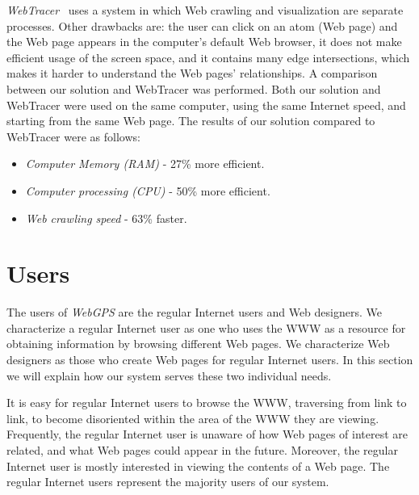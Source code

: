 \documentclass[10pt,psfig]{article}
\begin{document}
{%
{\em WebTracer}~\cite{webtracer} uses a system in which Web crawling and visualization are separate processes.
Other drawbacks are: the user can click on an atom (Web page) and the Web page appears in the computer's default Web browser, it does not make efficient usage of the screen space, and it contains many edge intersections, which makes it harder to understand the Web pages' relationships.
A comparison between our solution and WebTracer was performed.
Both our solution and WebTracer were used on the same computer, using the same Internet speed, and starting from the same Web page.
The results of our solution compared to WebTracer were as follows:

\begin{itemize}

\item {{\em Computer Memory (RAM)} - 27\% more efficient.}

\item {{\em Computer processing (CPU)} - 50\% more efficient.}

\item {{\em Web crawling speed} - 63\% faster.}

\end{itemize}

\section{Users}
\label{se:users}

The users of {\em WebGPS} are the regular Internet users and Web designers.  We characterize a regular Internet user as one who uses the WWW as a resource for 
obtaining information by browsing different Web pages.  
We characterize Web designers as those who create Web pages for regular Internet users.  
In this section we will explain how our system serves these two individual needs.

It is easy for regular Internet users to browse the WWW, traversing from link to link, to become disoriented within the area of the WWW they are viewing.  
Frequently, the regular Internet user is unaware of how Web pages of interest are related, and what Web pages could appear in the future. 
Moreover, the regular Internet user is mostly interested in viewing the contents of a Web page.
The regular Internet users represent the majority users of our system.

}
\end{document}
